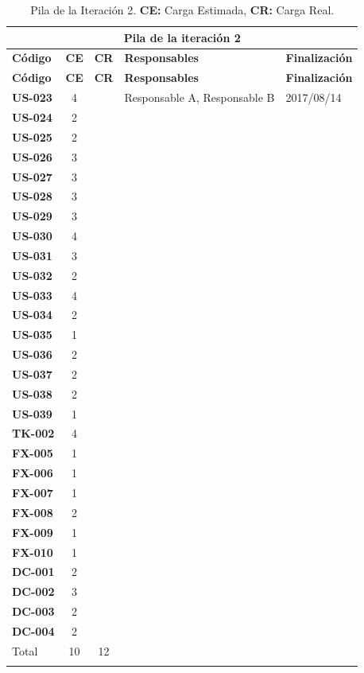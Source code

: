 \begin{longtable}{|l||c|c|p{7cm}|l|}

\multicolumn{5}{c}{Pila de la \textbf{iteración 2} }\\
\hline\hline
\textbf{Código} & \textbf{CE} & \textbf{CR} & \textbf{Responsables} & \textbf{Finalización} \\
\hline
\endfirsthead
\textbf{Código} & \textbf{CE} & \textbf{CR} & \textbf{Responsables} & \textbf{Finalización} \\
\hline\hline
\endhead

\textbf{US-023} & 4 &  & Responsable A, Responsable B & 2017/08/14 \\
\textbf{US-024} & 2 &  &  &  \\
\textbf{US-025} & 2 &  &  &  \\
\textbf{US-026} & 3 &  &  &  \\
\textbf{US-027} & 3 &  &  &  \\
\textbf{US-028} & 3 &  &  &  \\
\textbf{US-029} & 3 &  &  &  \\
\textbf{US-030} & 4 &  &  &  \\
\textbf{US-031} & 3 &  &  &  \\
\textbf{US-032} & 2 &  &  &  \\
\textbf{US-033} & 4 &  &  &  \\
\textbf{US-034} & 2 &  &  &  \\
\textbf{US-035} & 1 &  &  &  \\
\textbf{US-036} & 2 &  &  &  \\
\textbf{US-037} & 2 &  &  &  \\
\textbf{US-038} & 2 &  &  &  \\
\textbf{US-039} & 1 &  &  &  \\
\textbf{TK-002} & 4 &  &  &  \\
\textbf{FX-005} & 1 &  &  &  \\
\textbf{FX-006} & 1 &  &  &  \\
\textbf{FX-007} & 1 &  &  &  \\
\textbf{FX-008} & 2 &  &  &  \\
\textbf{FX-009} & 1 &  &  &  \\
\color{ForestGreen}
\textbf{FX-010} & 1 &  &  &  \\
\textbf{DC-001} & 2 &  &  &  \\
\textbf{DC-002} & 3 &  &  &  \\
\textbf{DC-003} & 2 &  &  &  \\
\textbf{DC-004} & 2 &  &  &  \\


\hline
Total & 10 & 12 & & \\
\hline

\caption{Pila de la Iteración 2. \textbf{CE:} Carga Estimada, \textbf{CR:} Carga Real.}
\label{SprintBacklog}

\end{longtable}

